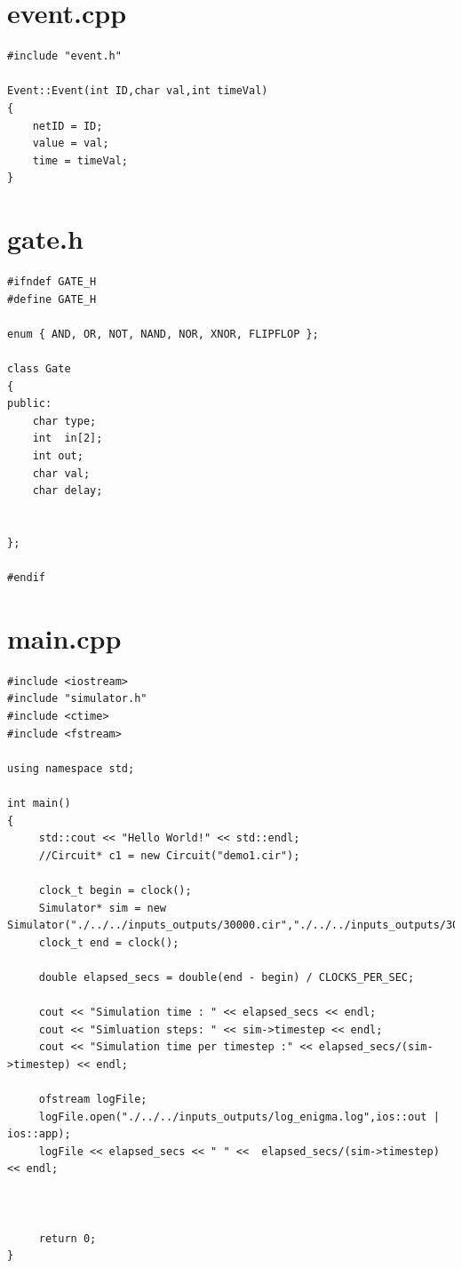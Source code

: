 \documentclass[a4paper,onesided,12pt]{report}
\begin{document}
\section{event.cpp}
\begin{verbatim}
#include "event.h"

Event::Event(int ID,char val,int timeVal)
{
	netID = ID;
	value = val;
	time = timeVal;
}
\end{verbatim}

\section{gate.h}
\begin{verbatim}
#ifndef GATE_H
#define GATE_H

enum { AND, OR, NOT, NAND, NOR, XNOR, FLIPFLOP };

class Gate
{
public:
	char type;
	int  in[2];
	int out;
	char val;
	char delay;


};

#endif
\end{verbatim}
\section{main.cpp}
\begin{verbatim}
#include <iostream>
#include "simulator.h"
#include <ctime>
#include <fstream>

using namespace std;

int main()
{
	 std::cout << "Hello World!" << std::endl;
	 //Circuit* c1 = new Circuit("demo1.cir");

	 clock_t begin = clock();
	 Simulator* sim = new Simulator("./../../inputs_outputs/30000.cir","./../../inputs_outputs/30000.run","./../../inputs_outputs/30000_enigma.out");
	 clock_t end = clock();

	 double elapsed_secs = double(end - begin) / CLOCKS_PER_SEC;

	 cout << "Simulation time : " << elapsed_secs << endl;
	 cout << "Simluation steps: " << sim->timestep << endl;
	 cout << "Simulation time per timestep :" << elapsed_secs/(sim->timestep) << endl;

	 ofstream logFile;
	 logFile.open("./../../inputs_outputs/log_enigma.log",ios::out | ios::app);
	 logFile << elapsed_secs << " " <<  elapsed_secs/(sim->timestep) << endl;



	 return 0;
}
\end{verbatim}
\end{document}

